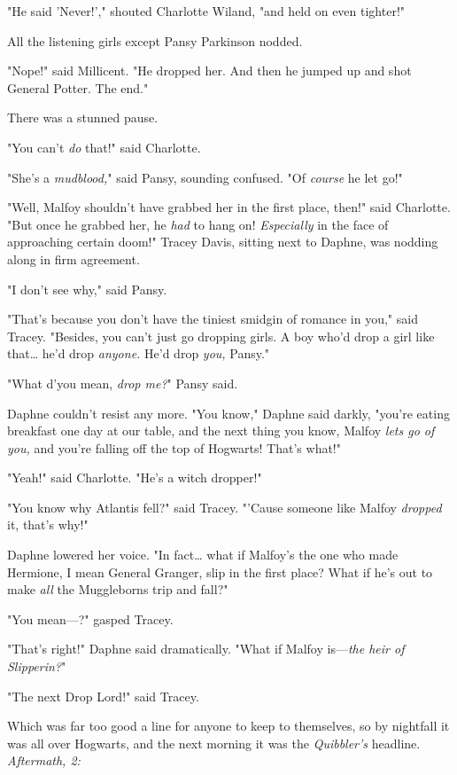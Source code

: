 "He said 'Never!'," shouted Charlotte Wiland, "and held on even tighter!"

All the listening girls except Pansy Parkinson nodded.

"Nope!" said Millicent. "He dropped her. And then he jumped up and shot General 
Potter. The end."

There was a stunned pause.

"You can't \emph{do} that!" said Charlotte.

"She's a \emph{mudblood,}" said Pansy, sounding confused. "Of \emph{course} he 
let go!"

"Well, Malfoy shouldn't have grabbed her in the first place, then!" said 
Charlotte. "But once he grabbed her, he \emph{had} to hang on! 
\emph{Especially} in the face of approaching certain doom!" Tracey Davis, 
sitting next to Daphne, was nodding along in firm agreement.

"I don't see why," said Pansy.

"That's because you don't have the tiniest smidgin of romance in you," said 
Tracey. "Besides, you can't just go dropping girls. A boy who'd drop a girl 
like that{\ldots} he'd drop \emph{anyone.} He'd drop \emph{you,} Pansy."

"What d'you mean, \emph{drop me?}" Pansy said.

Daphne couldn't resist any more. "You know," Daphne said darkly, "you're eating 
breakfast one day at our table, and the next thing you know, Malfoy \emph{lets 
go of you,} and you're falling off the top of Hogwarts! That's what!"

"Yeah!" said Charlotte. "He's a witch dropper!"

"You know why Atlantis fell?" said Tracey. "'Cause someone like Malfoy 
\emph{dropped} it, that's why!"

Daphne lowered her voice. "In fact{\ldots} what if Malfoy's the one who made 
Hermione, I mean General Granger, slip in the first place? What if he's out to 
make \emph{all} the Muggleborns trip and fall?"

"You mean---?" gasped Tracey.

"That's right!" Daphne said dramatically. "What if Malfoy is---\emph{the heir 
of Slipperin?}"

"The next Drop Lord!" said Tracey.

Which was far too good a line for anyone to keep to themselves, so by nightfall 
it was all over Hogwarts, and the next morning it was the \emph{Quibbler's} 
headline.
\sbreak
\emph{Aftermath, 2:}

